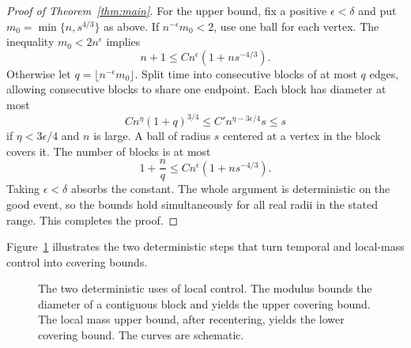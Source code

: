\begin{proof}[Proof of Theorem~\ref{thm:main}]
For the upper bound, fix a positive $\epsilon<\delta$ and put
$m_0=\min\{n,s^{4/3}\}$ as above. If $n^{-\epsilon}m_0<2$, use one ball for each vertex. The inequality $m_0<2n^\epsilon$ implies
\[
 n+1\le Cn^\epsilon(1+ns^{-4/3}).
\]
Otherwise let $q=\lfloor n^{-\epsilon}m_0\rfloor$. Split time into consecutive blocks of at most $q$ edges, allowing consecutive blocks to share one endpoint. Each block has diameter at most
\[
 C n^\eta(1+q)^{3/4}
 \le C' n^{\eta-3\epsilon/4}s\le s
\]
if $\eta<3\epsilon/4$ and $n$ is large. A ball of radius $s$ centered at a vertex in the block covers it. The number of blocks is at most
\[
 1+\frac n q\le C n^\epsilon(1+ns^{-4/3}).
\]
Taking $\epsilon<\delta$ absorbs the constant. The whole argument is deterministic on the good event, so the bounds hold simultaneously for all real radii in the stated range. This completes the proof.
\end{proof}

Figure~\ref{fig:covering} illustrates the two deterministic steps
that turn temporal and local-mass control into covering bounds.

\begin{figure}[htbp]
\centering
{}
\caption{The two deterministic uses of local control. The modulus bounds the diameter of a contiguous block and yields the upper covering bound. The local mass upper bound, after recentering, yields the lower covering bound. The curves are schematic.}
\label{fig:covering}
\end{figure}

